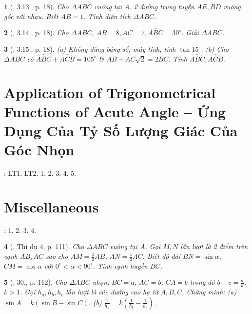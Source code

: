 \documentclass{article}
\newtheorem{baitoan}{}
\begin{document}
\begin{baitoan}[\cite{TLCT_THCS_Toan_9_hinh_hoc}, 3.13., p. 18]
	Cho $\Delta ABC$ vuông tại A. 2 đường trung tuyến $AE,BD$ vuông góc với nhau. Biết $AB = 1$. Tính diện tích $\Delta ABC$.
\end{baitoan}

\begin{baitoan}[\cite{TLCT_THCS_Toan_9_hinh_hoc}, 3.14., p. 18]
	Cho $\Delta ABC$, $AB = 8,AC = 7,\widehat{ABC} = 30^\circ$. Giải $\Delta ABC$.
\end{baitoan}

\begin{baitoan}[\cite{TLCT_THCS_Toan_9_hinh_hoc}, 3.15., p. 18]
	(a) Không dùng bảng số, máy tính, tính $\tan15^\circ$. (b) Cho $\Delta ABC$ có $\widehat{ABC} + \widehat{ACB} = 105^\circ$ \& $AB + AC\sqrt{2} = 2BC$. Tính $\widehat{ABC},\widehat{ACB}$.
\end{baitoan}


\section{Application of Trigonometrical Functions of Acute Angle -- Ứng Dụng Của Tỷ Số Lượng Giác Của Góc Nhọn}
\cite[Chap. IV, \S3, pp. 88--91]{SGK_Toan_9_Canh_Dieu_tap_1}: LT1. LT2. 1. 2. 3. 4. 5.


\section{Miscellaneous}
\cite[BTCCIV, pp. 92--93]{SGK_Toan_9_Canh_Dieu_tap_1}: 1. 2. 3. 4.

\begin{baitoan}[\cite{Tuyen_Toan_9_old}, Thí dụ 4, p. 111]
	Cho $\Delta ABC$ vuông tại $A$. Gọi $M,N$ lần lượt là 2 điểm trên cạnh $AB,AC$ sao cho $AM = \frac{1}{3}AB$, $AN = \frac{1}{3}AC$. Biết độ dài $BN = \sin\alpha$, $CM = \cos\alpha$ với $0^\circ < \alpha < 90^\circ$. Tính cạnh huyền $BC$.
\end{baitoan}

\begin{baitoan}[\cite{Tuyen_Toan_9_old}, 30., p. 112]
	Cho $\Delta ABC$ nhọn, $BC = a$, $AC = b$, $CA = b$ trong đó $b - c = \frac{a}{k}$, $k > 1$. Gọi $h_a,h_b,h_c$ lần lượt là các đường cao hạ từ $A,B,C$. Chứng minh: (a) $\sin A = k(\sin B - \sin C)$. (b) $\frac{1}{h_a} = k\left(\frac{1}{h_b} - \frac{1}{h_c}\right)$.
\end{baitoan}
\end{document}
